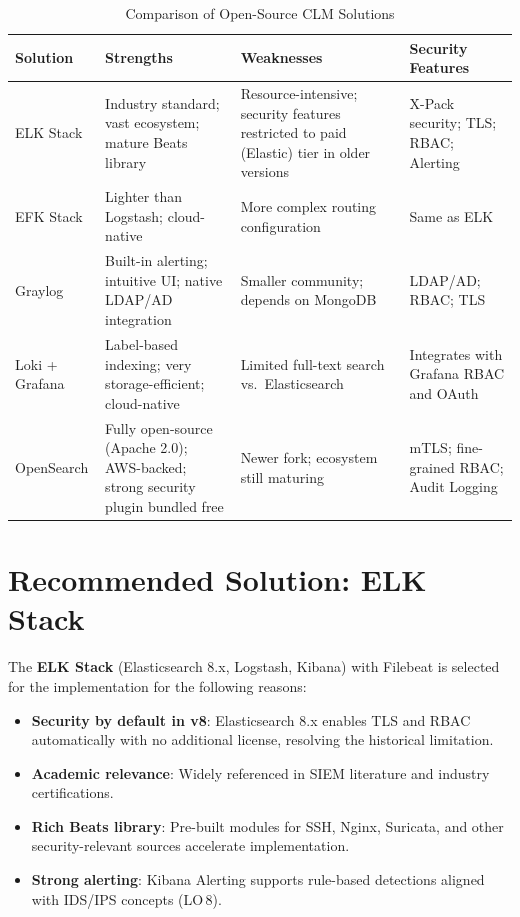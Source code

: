 \documentclass[12pt,a4paper]{report}
\begin{document}
\begin{table}[H]
\centering
\caption{Comparison of Open-Source CLM Solutions}
\label{tab:solutions}
\begin{tabularx}{\textwidth}{lXXX}
\toprule
\textbf{Solution} & \textbf{Strengths} & \textbf{Weaknesses} & \textbf{Security Features} \\
\midrule
ELK Stack
  & Industry standard; vast ecosystem; mature Beats library
  & Resource-intensive; security features restricted to paid (Elastic) tier in older versions
  & X-Pack security; TLS; RBAC; Alerting \\
\addlinespace
EFK Stack
  & Lighter than Logstash; cloud-native
  & More complex routing configuration
  & Same as ELK \\
\addlinespace
Graylog
  & Built-in alerting; intuitive UI; native LDAP/AD integration
  & Smaller community; depends on MongoDB
  & LDAP/AD; RBAC; TLS \\
\addlinespace
Loki + Grafana
  & Label-based indexing; very storage-efficient; cloud-native
  & Limited full-text search vs.\ Elasticsearch
  & Integrates with Grafana RBAC and OAuth \\
\addlinespace
OpenSearch
  & Fully open-source (Apache 2.0); AWS-backed; strong security plugin bundled free
  & Newer fork; ecosystem still maturing
  & mTLS; fine-grained RBAC; Audit Logging \\
\bottomrule
\end{tabularx}
\end{table}

\section{Recommended Solution: ELK Stack}

The \textbf{ELK Stack} (Elasticsearch 8.x, Logstash, Kibana) with Filebeat is selected
for the implementation \cite{elasticdocs} for the following reasons:

\begin{itemize}[leftmargin=1.5em]
    \item \textbf{Security by default in v8}: Elasticsearch 8.x enables TLS and RBAC
          automatically with no additional license, resolving the historical limitation.
    \item \textbf{Academic relevance}: Widely referenced in SIEM literature and
          industry certifications.
    \item \textbf{Rich Beats library}: Pre-built modules for SSH, Nginx, Suricata, and
          other security-relevant sources accelerate implementation.
    \item \textbf{Strong alerting}: Kibana Alerting supports rule-based detections
          aligned with IDS/IPS concepts (LO\,8).
\end{itemize}
\end{document}
